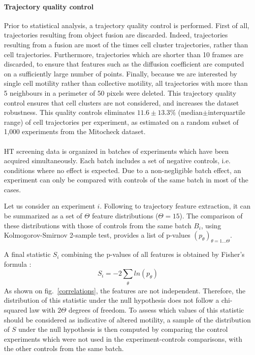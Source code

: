 \paragraph{Trajectory quality control}
 Prior to statistical analysis, a trajectory quality control is performed. First of all, trajectories resulting from object fusion are discarded. Indeed, trajectories resulting from a fusion are most of the times cell cluster trajectories, rather than cell trajectories. Furthermore, trajectories which are
shorter than 10 frames are discarded, to ensure that features such as the diffusion coefficient are computed on a sufficiently large number of points. Finally, because we are interested by single cell motility rather than collective motility, all trajectories with more than 5 neighbours in a perimeter of 50 pixels were deleted. This trajectory quality control ensures that cell clusters are not considered, and increases the dataset robustness. This quality controls eliminates $11.6\pm 13.3 \%$ (median$\pm$interquartile range) of cell trajectories per experiment, as estimated on a random subset of 1,000 experiments from the Mitocheck dataset.
\paragraph*{}
HT screening data is organized in batches of experiments which have
been acquired simultaneously. Each batch includes a set of negative
controls, i.e. conditions where no effect is expected. Due to a
non-negligible batch effect, an experiment can only be compared with
controls of the same batch in most of the cases. 

Let us consider an experiment $i$. Following to trajectory feature extraction, it can be summarized as a set of $\Theta$ feature distributions ($\Theta = 15$). The comparison of these distributions with those of controls from the same batch $B_i$, using Kolmogorov-Smirnov 2-sample test, provides a list of p-values $(p_\theta)_{\theta=1\ldots\Theta} $. 

A final statistic $S_{i}$ combining the p-values of all features is  obtained by Fisher's formula :
\begin{equation}\label{FisherFormula}
S_{i}=-2 \sum_{\substack{\theta}}ln(p_\theta)
\end{equation}
As shown on fig.~\ref{correlations}, the features are not independent. Therefore, the distribution of this statistic under the null hypothesis does not follow a chi-squared law with $2\Theta$ degrees of freedom. To assess which values of this statistic should be considered as indicative of altered motility, a sample of the distribution of $S$ under the null hypothesis is then computed by comparing the control experiments  which were not used in the experiment-controls comparisons, with the other controls from the same batch.

